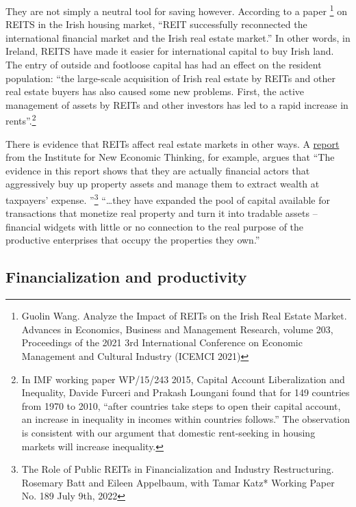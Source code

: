 They are not simply a neutral tool for saving however. According to a paper \cite{wangAnalyzeImpactREITs2021}\footnote{Guolin Wang. Analyze the Impact of REITs on the Irish Real Estate Market. Advances in Economics, Business and Management Research, volume 203, Proceedings of the 2021 3rd International Conference on Economic Management and Cultural Industry (ICEMCI 2021)} on REITS in the Irish housing market, ``REIT successfully reconnected the international financial market and the Irish real estate market.'' In other words, in Ireland, REITS have made it easier for international capital to buy Irish land. The entry of outside and footloose capital has had an effect on the resident population:  ``the large-scale acquisition of Irish real estate by REITs and other real estate buyers has also caused some new problems. First, the active management of assets by REITs and other investors has led to a rapid increase in rents''.\footnote{In IMF working paper WP/15/243 2015, Capital Account Liberalization and Inequality, Davide Furceri and Prakash Loungani found that for 149 countries from 1970 to 2010, ``after countries take steps to open their capital account, an increase in inequality in incomes within countries follows.'' The observation is consistent with our argument  that domestic rent-seeking in housing markets will increase inequality.}   \cite{furceriCapitalAccountLiberalization2015}

There is evidence that REITs affect real estate markets in other ways. A \href{https://www.ineteconomics.org/research/research-papers/the-role-of-public-reits-in-financialization-and-industry-restructuring}{report} from the Institute for New Economic Thinking, for example, argues that ``The evidence in this report shows that they are actually financial actors that aggressively buy up property assets and manage them to extract wealth at taxpayers’ expense. ''\footnote{The Role of Public REITs in Financialization and Industry Restructuring. Rosemary Batt and Eileen Appelbaum, with Tamar Katz* Working Paper No. 189 July 9th, 2022} ``\dots they have expanded the pool of capital available for transactions that monetize real property and turn it into tradable assets – financial widgets with little or no connection to the real purpose of the productive enterprises that occupy the properties they own.''

\subsection{Financialization and productivity}

